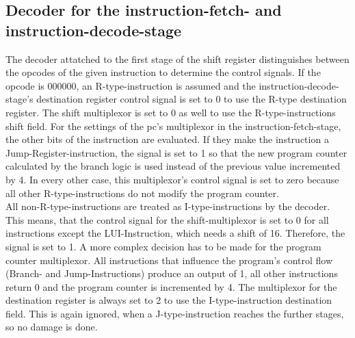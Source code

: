 \subsection{Decoder for the instruction-fetch- and instruction-decode-stage}
The decoder attatched to the first stage of the shift register distinguishes between the opcodes of the given instruction to determine the control signals. If the opcode is 000000, an R-type-instruction is assumed and the instruction-decode-stage's destination register control signal is set to 0 to use the R-type destination register. The shift multiplexor is set to 0 as well to use the R-type-instructions shift field. For the settings of the pc's multiplexor in the instruction-fetch-stage, the other bits of the instruction are evaluated. If they make the instruction a Jump-Register-instruction, the signal is set to 1 so that the new program counter calculated by the branch logic is used instead of the previous value incremented by 4. In every other case, this multiplexor's control signal is set to zero because all other R-type-instructions do not modify the program counter.\\
All non-R-type-instructions are treated as I-type-instructions by the decoder. This means, that the control signal for the shift-multiplexor is set to 0 for all instructions except the LUI-Instruction, which needs a shift of 16. Therefore, the signal is set to 1. A more complex decision has to be made for the program counter multiplexor. All instructions that influence the program's control flow (Branch- and Jump-Instructions) produce an output of 1, all other instructions return 0 and the program counter is incremented by 4. The multiplexor for the destination register is always set to 2 to use the I-type-instruction destination field. This is again ignored, when a J-type-instruction reaches the further stages, so no damage is done.
